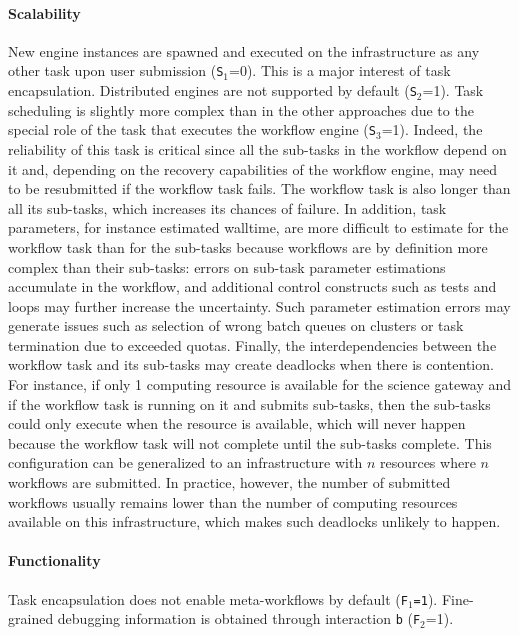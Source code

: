 \documentclass[preprint,3p,twocolumn]{elsarticle}
\newcommand{\correction}[1]{\color{blue}#1\color{black}\xspace}
\begin{document}
\paragraph{Scalability}
New engine instances are spawned and executed on the infrastructure as
any other task upon user submission (\texttt{S$_1$}=0). This is a
major interest of task encapsulation. Distributed engines are not
supported by default (\texttt{S$_2$}=1). Task scheduling is slightly
more complex than in the other approaches due to the special role of
the task that executes the workflow engine (\texttt{S$_3$}=1). 
Indeed,
the reliability of this task is critical since all the sub-tasks in
the workflow depend on it and, depending on the recovery capabilities
of the workflow engine, may need to be resubmitted if the workflow
task fails. The workflow task is also longer than all its sub-tasks,
which increases its chances of failure. In addition, task parameters,
for instance estimated walltime, are more difficult to estimate for
the workflow task than for the sub-tasks because workflows are by
definition more complex than their sub-tasks: errors on sub-task
parameter estimations accumulate in the workflow, and additional
control constructs such as tests and loops may further increase the
uncertainty. Such parameter estimation errors may generate issues such
as selection of wrong batch queues on clusters or task termination due
to exceeded quotas. Finally, the interdependencies between
the workflow task and its sub-tasks may create deadlocks when there is
contention. For instance, if only 1 computing resource is available
for the science gateway and if the workflow task is running on it and
submits sub-tasks, then the sub-tasks could only execute when the
resource is available, which will never happen because the workflow
task will not complete until the sub-tasks complete. This
configuration can be generalized to an infrastructure with $n$
resources where $n$ workflows are submitted. In practice, however, the
number of submitted workflows usually remains lower than the number of
computing resources available on this infrastructure, which makes such
deadlocks unlikely to happen. 

\paragraph{\correction{Functionality}} Task encapsulation
\correction{does not enable meta-workflows by default
  (\texttt{\correction{F}$_1$=1})}. Fine-grained debugging information is obtained
through interaction \texttt{b} (\texttt{\correction{F}$_2$}=1).
\end{document}
